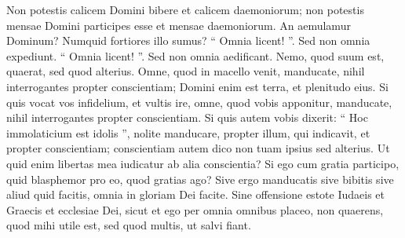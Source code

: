\begin{biblechapter}
\begin{biblechapter}
\begin{biblechapter}
\begin{biblechapter}
\begin{biblechapter}
\begin{biblechapter}
\begin{biblechapter}
\begin{biblechapter}
\begin{biblechapter}
\begin{biblechapter}
\verse Non potestis calicem Domini bibere et calicem daemoniorum; non potestis mensae Domini participes esse et mensae daemoniorum. 
\verse An aemulamur Dominum? Numquid fortiores illo sumus?
 \verse “ Omnia licent! ”. Sed non omnia expediunt. “ Omnia licent! ”. Sed non omnia aedificant. 
\verse Nemo, quod suum est, quaerat, sed quod alterius. 
\verse Omne, quod in macello venit, manducate, nihil interrogantes propter conscientiam; 
 \verse Domini enim est terra, et plenitudo eius.
 \verse Si quis vocat vos infidelium, et vultis ire, omne, quod vobis apponitur, manducate, nihil interrogantes propter conscientiam. 
\verse Si quis autem vobis dixerit: “ Hoc immolaticium est idolis ”, nolite manducare, propter illum, qui indicavit, et propter conscientiam; 
\verse conscientiam autem dico non tuam ipsius sed alterius. Ut quid enim libertas mea iudicatur ab alia conscientia? 
 \verse Si ego cum gratia participo, quid blasphemor pro eo, quod gratias ago?
 \verse Sive ergo manducatis sive bibitis sive aliud quid facitis, omnia in gloriam Dei facite. 
\verse Sine offensione estote Iudaeis et Graecis et ecclesiae Dei, 
 \verse sicut et ego per omnia omnibus placeo, non quaerens, quod mihi utile est, sed quod multis, ut salvi fiant.
 

\end{biblechapter}
\end{biblechapter}
\end{biblechapter}
\end{biblechapter}
\end{biblechapter}
\end{biblechapter}
\end{biblechapter}
\end{biblechapter}
\end{biblechapter}
\end{biblechapter}
